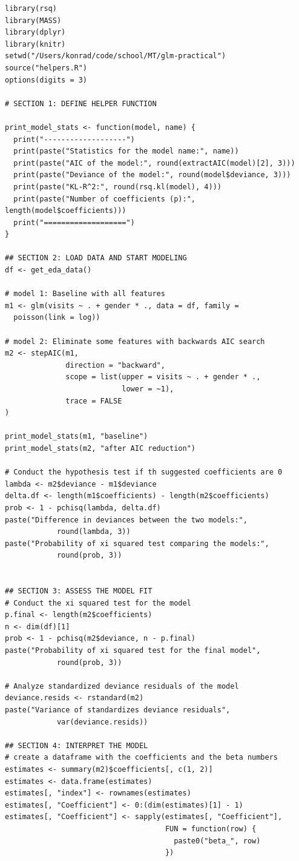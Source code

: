 \documentclass[a4paper,11pt]{article}
\begin{document}
\begin{verbatim}
library(rsq)
library(MASS)
library(dplyr)
library(knitr)
setwd("/Users/konrad/code/school/MT/glm-practical")
source("helpers.R")
options(digits = 3)

# SECTION 1: DEFINE HELPER FUNCTION

print_model_stats <- function(model, name) {
  print("-------------------")
  print(paste("Statistics for the model name:", name))
  print(paste("AIC of the model:", round(extractAIC(model)[2], 3)))
  print(paste("Deviance of the model:", round(model$deviance, 3)))
  print(paste("KL-R^2:", round(rsq.kl(model), 4)))
  print(paste("Number of coefficients (p):", length(model$coefficients)))
  print("===================")
}

## SECTION 2: LOAD DATA AND START MODELING
df <- get_eda_data()

# model 1: Baseline with all features
m1 <- glm(visits ~ . + gender * ., data = df, family =
  poisson(link = log))

# model 2: Eliminate some features with backwards AIC search
m2 <- stepAIC(m1,
              direction = "backward",
              scope = list(upper = visits ~ . + gender * .,
                           lower = ~1),
              trace = FALSE
)

print_model_stats(m1, "baseline")
print_model_stats(m2, "after AIC reduction")

# Conduct the hypothesis test if th suggested coefficients are 0
lambda <- m2$deviance - m1$deviance
delta.df <- length(m1$coefficients) - length(m2$coefficients)
prob <- 1 - pchisq(lambda, delta.df)
paste("Difference in deviances between the two models:",
            round(lambda, 3))
paste("Probability of xi squared test comparing the models:",
            round(prob, 3))


## SECTION 3: ASSESS THE MODEL FIT
# Conduct the xi squared test for the model
p.final <- length(m2$coefficients)
n <- dim(df)[1]
prob <- 1 - pchisq(m2$deviance, n - p.final)
paste("Probability of xi squared test for the final model",
            round(prob, 3))

# Analyze standardized deviance residuals of the model
deviance.resids <- rstandard(m2)
paste("Variance of standardizes deviance residuals",
            var(deviance.resids))

## SECTION 4: INTERPRET THE MODEL
# create a dataframe with the coefficients and the beta numbers
estimates <- summary(m2)$coefficients[, c(1, 2)]
estimates <- data.frame(estimates)
estimates[, "index"] <- rownames(estimates)
estimates[, "Coefficient"] <- 0:(dim(estimates)[1] - 1)
estimates[, "Coefficient"] <- sapply(estimates[, "Coefficient"],
                                     FUN = function(row) {
                                       paste0("beta_", row)
                                     })


\end{verbatim}
\end{document}
